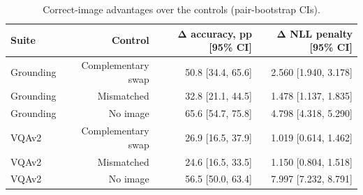 \begin{table}[t]
\centering\small
\begin{tabular}{lrrr}
\toprule
Suite & Control & Δ accuracy, pp [95\% CI] & Δ NLL penalty [95\% CI] \\
\midrule
Grounding & Complementary swap & 50.8 [34.4, 65.6] & 2.560 [1.940, 3.178] \\
Grounding & Mismatched & 32.8 [21.1, 44.5] & 1.478 [1.137, 1.835] \\
Grounding & No image & 65.6 [54.7, 75.8] & 4.798 [4.318, 5.290] \\
VQAv2 & Complementary swap & 26.9 [16.5, 37.9] & 1.019 [0.614, 1.462] \\
VQAv2 & Mismatched & 24.6 [16.5, 33.5] & 1.150 [0.804, 1.518] \\
VQAv2 & No image & 56.5 [50.0, 63.4] & 7.997 [7.232, 8.791] \\
\bottomrule
\end{tabular}
\caption{Correct-image advantages over the controls (pair-bootstrap CIs).}
\label{tab:task2_advantages}
\end{table}
